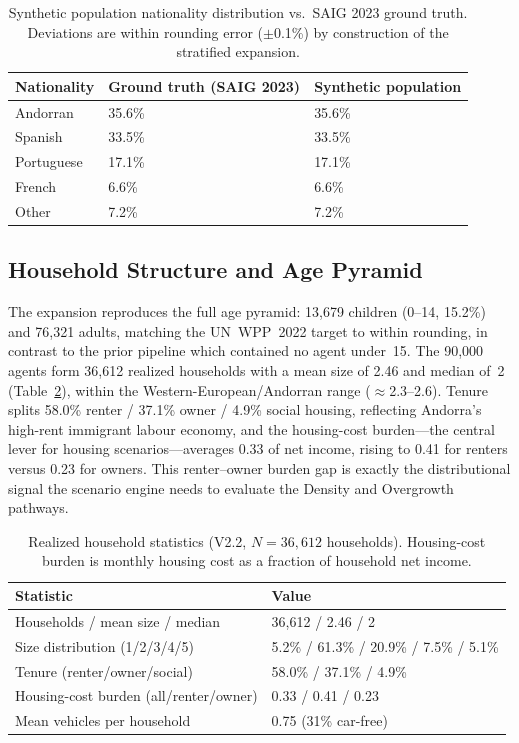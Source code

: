 \documentclass[a4paper,12pt]{article}
\begin{document}
\begin{table}[H]
\caption{Synthetic population nationality distribution vs.\ SAIG 2023
ground truth. Deviations are within rounding error ($\pm$0.1\%) by
construction of the stratified expansion.}
\label{tab:demographics}
\begin{tabularx}{\textwidth}{lXX}
\toprule
\textbf{Nationality} & \textbf{Ground truth (SAIG 2023)} & \textbf{Synthetic population} \\
\midrule
Andorran   & 35.6\% & 35.6\% \\
Spanish    & 33.5\% & 33.5\% \\
Portuguese & 17.1\% & 17.1\% \\
French     &  6.6\% &  6.6\% \\
Other      &  7.2\% &  7.2\% \\
\bottomrule
\end{tabularx}
\end{table}

\subsection{Household Structure and Age Pyramid}
\label{subsec:household_results}

The expansion reproduces the full age pyramid: 13{,}679 children (0--14, 15.2\%)
and 76{,}321 adults, matching the UN~WPP~2022 target to within rounding, in contrast
to the prior pipeline which contained no agent under~15. The 90,000 agents form
36{,}612 realized households with a mean size of 2.46 and median of~2
(Table~\ref{tab:household_stats}), within the Western-European/Andorran range
($\approx$2.3--2.6). Tenure splits 58.0\% renter / 37.1\% owner / 4.9\% social
housing, reflecting Andorra's high-rent immigrant labour economy, and the
housing-cost burden---the central lever for housing scenarios---averages 0.33 of
net income, rising to 0.41 for renters versus 0.23 for owners. This renter--owner
burden gap is exactly the distributional signal the scenario engine needs to
evaluate the Density and Overgrowth pathways.

\begin{table}[H]
\caption{Realized household statistics (V2.2, $N = 36{,}612$ households).
Housing-cost burden is monthly housing cost as a fraction of household net income.}
\label{tab:household_stats}
\begin{tabularx}{\textwidth}{lX}
\toprule
\textbf{Statistic} & \textbf{Value} \\
\midrule
Households / mean size / median   & 36{,}612 / 2.46 / 2 \\
Size distribution (1/2/3/4/5)     & 5.2\% / 61.3\% / 20.9\% / 7.5\% / 5.1\% \\
Tenure (renter/owner/social)      & 58.0\% / 37.1\% / 4.9\% \\
Housing-cost burden (all/renter/owner) & 0.33 / 0.41 / 0.23 \\
Mean vehicles per household       & 0.75 (31\% car-free) \\
\bottomrule
\end{tabularx}
\end{table}
\end{document}
